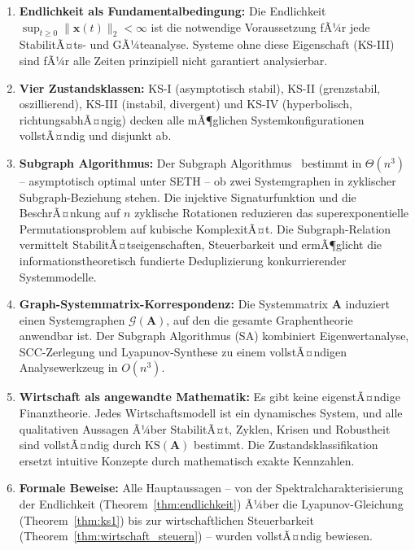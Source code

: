 ﻿\documentclass[12pt, a4paper, titlepage]{report}
\theoremstyle{definition}
\theoremstyle{remark}
\newcommand{\vx}{\bm{x}}
\newcommand{\vA}{\bm{A}}
\newcommand{\KS}{\mathrm{KS}}
\begin{document}
\begin{enumerate}[label=(\roman*)]
  \item \textbf{Endlichkeit als Fundamentalbedingung:} Die Endlichkeit
    $\sup_{t\geq 0}\|\vx(t)\|_2 < \infty$ ist die notwendige Voraussetzung fÃ¼r
    jede StabilitÃ¤ts- und GÃ¼teanalyse. Systeme ohne diese Eigenschaft (KS-III)
    sind fÃ¼r alle Zeiten prinzipiell nicht garantiert analysierbar.

  \item \textbf{Vier Zustandsklassen:} KS-I (asymptotisch stabil), KS-II
    (grenzstabil, oszillierend), KS-III (instabil, divergent) und KS-IV
    (hyperbolisch, richtungsabhÃ¤ngig) decken alle mÃ¶glichen Systemkonfigurationen
    vollstÃ¤ndig und disjunkt ab.

  \item \textbf{Subgraph Algorithmus:} Der Subgraph Algorithmus~\citep{epp2026subgraph}
    bestimmt in $\Theta(n^3)$ -- asymptotisch optimal unter SETH -- ob zwei
    Systemgraphen in zyklischer Subgraph-Beziehung stehen. Die injektive
    Signaturfunktion und die BeschrÃ¤nkung auf $n$ zyklische Rotationen reduzieren
    das superexponentielle Permutationsproblem auf kubische KomplexitÃ¤t.
    Die Subgraph-Relation vermittelt StabilitÃ¤tseigenschaften, Steuerbarkeit und
    ermÃ¶glicht die informationstheoretisch fundierte Deduplizierung konkurrierender
    Systemmodelle.

  \item \textbf{Graph-Systemmatrix-Korrespondenz:} Die Systemmatrix $\vA$ induziert
    einen Systemgraphen $\mathcal{G}(\vA)$, auf den die gesamte Graphentheorie
    anwendbar ist. Der Subgraph Algorithmus (SA) kombiniert Eigenwertanalyse,
    SCC-Zerlegung und Lyapunov-Synthese zu einem vollstÃ¤ndigen Analysewerkzeug
    in $O(n^3)$.

  \item \textbf{Wirtschaft als angewandte Mathematik:} Es gibt keine eigenstÃ¤ndige
    Finanztheorie. Jedes Wirtschaftsmodell ist ein dynamisches System, und alle
    qualitativen Aussagen Ã¼ber StabilitÃ¤t, Zyklen, Krisen und Robustheit sind
    vollstÃ¤ndig durch $\KS(\vA)$ bestimmt. Die Zustandsklassifikation ersetzt
    intuitive Konzepte durch mathematisch exakte Kennzahlen.

  \item \textbf{Formale Beweise:} Alle Hauptaussagen -- von der Spektralcharakterisierung
    der Endlichkeit (Theorem~\ref{thm:endlichkeit}) Ã¼ber die Lyapunov-Gleichung
    (Theorem~\ref{thm:ks1}) bis zur wirtschaftlichen Steuerbarkeit
    (Theorem~\ref{thm:wirtschaft_steuern}) -- wurden vollstÃ¤ndig bewiesen.


\end{enumerate}
\end{document}
